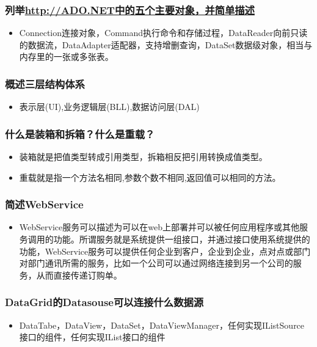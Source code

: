 \documentclass[9pt, b5paper]{article}
\begin{document}
\subsubsection{列举\url{http://ADO.NET中的五个主要对象，并简单描述}}
\label{sec-1-2-103}
\begin{itemize}
\item Connection连接对象，Command执行命令和存储过程，DataReader向前只读的数据流，DataAdapter适配器，支持增删查询，DataSet数据级对象，相当与内存里的一张或多张表。
\end{itemize}
\subsubsection{概述三层结构体系}
\label{sec-1-2-104}
\begin{itemize}
\item 表示层(UI),业务逻辑层(BLL),数据访问层(DAL)
\end{itemize}
\subsubsection{什么是装箱和拆箱？什么是重载？}
\label{sec-1-2-105}
\begin{itemize}
\item 装箱就是把值类型转成引用类型，拆箱相反把引用转换成值类型。
\item 重载就是指一个方法名相同,参数个数不相同,返回值可以相同的方法。
\end{itemize}
\subsubsection{简述WebService}
\label{sec-1-2-106}
\begin{itemize}
\item WebService服务可以描述为可以在web上部署并可以被任何应用程序或其他服务调用的功能。所谓服务就是系统提供一组接口，并通过接口使用系统提供的功能，WebService服务可以提供任何企业到客户，企业到企业，点对点或部门对部门通讯所需的服务，比如一个公司可以通过网络连接到另一个公司的服务，从而直接传递订购单。
\end{itemize}
\subsubsection{DataGrid的Datasouse可以连接什么数据源}
\label{sec-1-2-107}
\begin{itemize}
\item DataTabe，DataView，DataSet，DataViewManager，任何实现IListSource接口的组件，任何实现IList接口的组件
\end{itemize}
\end{document}
